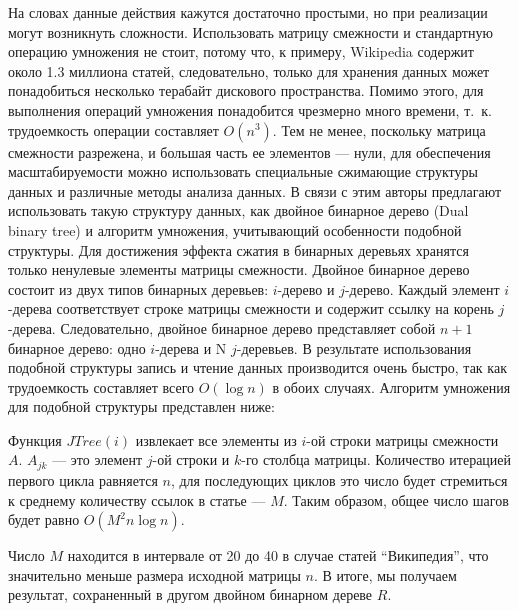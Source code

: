 На словах данные действия кажутся достаточно простыми, но при реализации могут возникнуть сложности. 
Использовать матрицу смежности и стандартную операцию умножения не стоит, потому что,
к примеру, Wikipedia содержит около 1.3 миллиона статей, 
следовательно,  только для хранения данных может понадобиться несколько терабайт дискового пространства. 
Помимо этого, для выполнения операций умножения
понадобится чрезмерно много времени, т.~к. трудоемкость операции составляет $O(n^3)$.
Тем не менее, поскольку матрица смежности разрежена, и большая часть ее элементов --- нули, 
для обеспечения масштабируемости можно использовать специальные сжимающие структуры данных и различные методы анализа данных. 
В связи с этим авторы предлагают использовать такую структуру данных, как двойное бинарное дерево (Dual binary tree) и алгоритм умножения, 
учитывающий особенности подобной структуры.
Для достижения эффекта сжатия в бинарных деревьях хранятся только ненулевые элементы матрицы 
смежности. Двойное бинарное дерево состоит из двух типов бинарных деревьев: 
$i$-дерево и $j$-дерево.
Каждый элемент $i$-дерева соответствует строке матрицы смежности и содержит ссылку на корень $j$-дерева.
Следовательно, двойное бинарное дерево представляет собой $n+1$ бинарное дерево: одно $i$-дерева и N  $j$-деревьев. 
В результате использования подобной структуры запись и чтение данных производится очень быстро, так как
трудоемкость составляет всего $O(\log n)$ в обоих случаях.
Алгоритм умножения для подобной структуры представлен ниже:



Функция $JTree(i)$ извлекает все элементы из $i$-ой строки матрицы смежности $A$.
$A_{jk}$ --- это элемент $j$-ой строки и $k$-го столбца матрицы. 
Количество итерацией первого цикла равняется $n$, для последующих циклов это число будет стремиться к среднему 
количеству ссылок в статье --- $M$. 
Таким образом, общее число шагов будет равно $O(M^2 n \log n)$. %

Число $M$ находится в интервале от 20 до 40 в случае статей ``Википедия'', %
что значительно меньше размера исходной матрицы $n$. В итоге, мы получаем результат, 
сохраненный в другом двойном бинарном дереве $R$.


